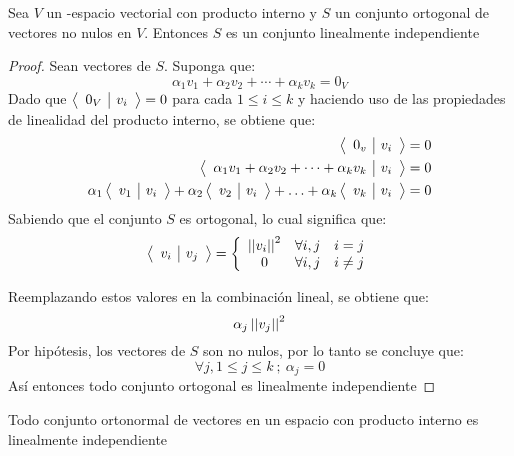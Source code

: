 \begin{theorem}
Sea $V$ un \dobleK-espacio vectorial con producto interno y $S$ un conjunto ortogonal de vectores no nulos en $V$. Entonces $S$ es un conjunto linealmente independiente
\end{theorem}
\begin{proof}
Sean  vectores de $S$. Suponga que:
$$\alpha_1 v_1 + \alpha_2 v_2 + \cdots + \alpha_k v_k = 0_V$$
Dado que $\left\langle \begin{array}{c|c} 0_V & v_i \end{array}\right\rangle = 0$ para cada $1 \leq i \leq k$ y haciendo uso de las propiedades de linealidad del producto interno, se obtiene que:
\begin{align*}
    \left\langle \begin{array}{c|c} 0_v & v_i \end{array}\right\rangle &= 0\\
    \left\langle \begin{array}{c|c} \alpha_1 v_1 + \alpha_2 v_2 + \cdots + \alpha_k v_k & v_i \end{array}\right\rangle &= 0 \\
    \alpha_1 \left\langle \begin{array}{c|c} v_1 & v_i \end{array}\right\rangle + \alpha_2 \left\langle \begin{array}{c|c} v_2 & v_i \end{array}\right\rangle + \hdots + \alpha_k \left\langle \begin{array}{c|c} v_k & v_i \end{array}\right\rangle &= 0
\end{align*}
Sabiendo que el conjunto $S$ es ortogonal, lo cual significa que:
$$\left\langle \begin{array}{c|c} v_i & v_j \end{array}\right\rangle = \left\{\begin{array}{cll}
    \left|\left| v_i \right|\right|^2& \forall i,j & i = j\\
    0 & \forall i,j & i \neq j 
\end{array}\right.$$

Reemplazando estos valores en la combinación lineal, se obtiene que:
$$\alpha_j \left|\left| v_j \right|\right|^2$$
Por hipótesis, los vectores de $S$ son no nulos, por lo tanto se concluye que:
$$\forall j , 1 \leq j \leq k \ ; \ \alpha_j = 0$$
Así entonces todo conjunto ortogonal es linealmente independiente
\end{proof}
\begin{theorem}[Corolario]
Todo conjunto ortonormal de vectores en un espacio con producto interno es linealmente independiente
\end{theorem}


